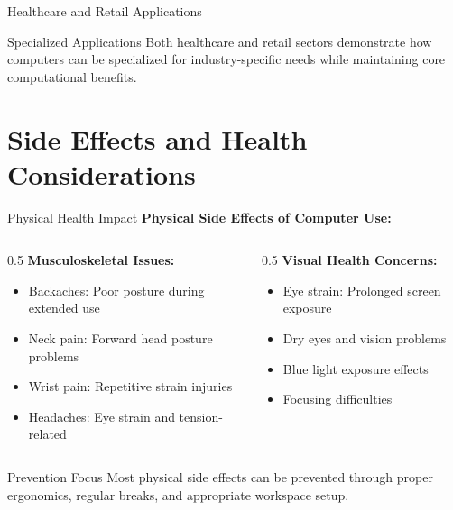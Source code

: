 \documentclass[aspectratio=169]{beamer}
\begin{document}
\begin{frame}{Healthcare and Retail Applications}
    \begin{block}{Specialized Applications}
    \tiny
        Both healthcare and retail sectors demonstrate how computers can be specialized for industry-specific needs while maintaining core computational benefits.
    \end{block}
\end{frame}

\section{Side Effects and Health Considerations}

\begin{frame}{Physical Health Impact}
    \textbf{Physical Side Effects of Computer Use:}
    
    \begin{columns}
        \begin{column}{0.5\textwidth}
            \textbf{Musculoskeletal Issues:}
            \begin{itemize}
                \item Backaches: Poor posture during extended use
                \item Neck pain: Forward head posture problems
                \item Wrist pain: Repetitive strain injuries
                \item Headaches: Eye strain and tension-related
            \end{itemize}
            
            
        \end{column}
        \begin{column}{0.5\textwidth}
            \textbf{Visual Health Concerns:}
            \begin{itemize}
                \item Eye strain: Prolonged screen exposure
                \item Dry eyes and vision problems
                \item Blue light exposure effects
                \item Focusing difficulties
            \end{itemize}
        \end{column}
    \end{columns}
    
    \begin{alertblock}{Prevention Focus}
        Most physical side effects can be prevented through proper ergonomics, regular breaks, and appropriate workspace setup.
    \end{alertblock}
\end{frame}
\end{document}
